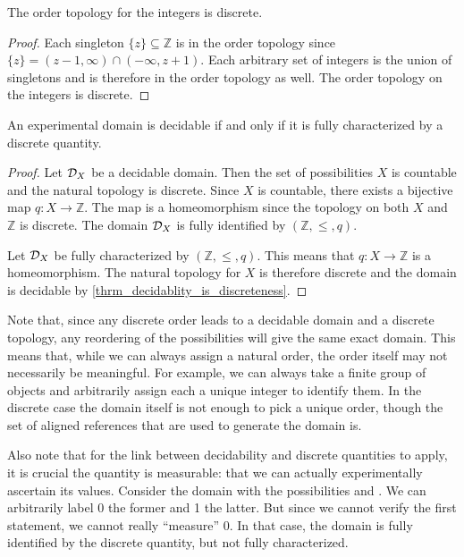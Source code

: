 \documentclass[11pt,letterpaper,fleqn]{memoir} %
\begin{document}
\begin{mathSection}
	\begin{prop}
		The order topology for the integers is discrete.
	\end{prop}
	\begin{proof}
		Each singleton $\{z\} \subseteq \mathbb{Z}$ is in the order topology since $\{z\} = (z-1, \infty) \cap (-\infty, z+1)$. Each arbitrary set of integers is the union of singletons and is therefore in the order topology as well. The order topology on the integers is discrete.
	\end{proof}
	
	\begin{prop}
		An experimental domain is decidable if and only if it is fully characterized by a discrete quantity.
	\end{prop}
	
	\begin{proof}
		Let $\mathcal{D}_X$ be a decidable domain. Then the set of possibilities $X$ is countable and the natural topology is discrete. Since $X$ is countable, there exists a bijective map $q: X \to \mathbb{Z}$. The map is a homeomorphism since the topology on both $X$ and $\mathbb{Z}$ is discrete. The domain $\mathcal{D}_X$ is fully identified by $(\mathbb{Z}, \leq, q)$.
		
		Let $\mathcal{D}_X$ be fully characterized by $(\mathbb{Z}, \leq, q)$. This means that $q : X \to \mathbb{Z}$ is a homeomorphism. The natural topology for $X$ is therefore discrete and the domain is decidable by \ref{thrm_decidablity_is_discreteness}.
	\end{proof}	
	
\end{mathSection}

Note that, since any discrete order leads to a decidable domain and a discrete topology, any reordering of the possibilities will give the same exact domain. This means that, while we can always assign a natural order, the order itself may not necessarily be meaningful. For example, we can always take a finite group of objects and arbitrarily assign each a unique integer to identify them. In the discrete case the domain itself is not enough to pick a unique order, though the set of aligned references that are used to generate the domain is.

Also note that for the link between decidability and discrete quantities to apply, it is crucial the quantity is measurable: that we can actually experimentally ascertain its values. Consider the domain with the possibilities  and . We can arbitrarily label 0 the former and 1 the latter. But since we cannot verify the first statement, we cannot really ``measure'' 0. In that case, the domain is fully identified by the discrete quantity, but not fully characterized.
\end{document}
